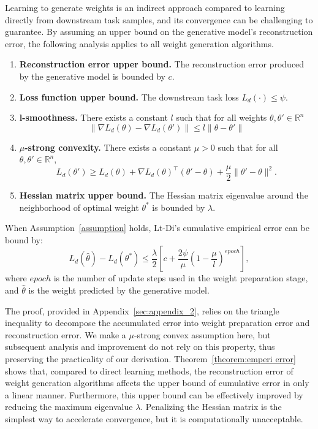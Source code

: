 Learning to generate weights is an indirect approach compared to learning directly from downstream task samples, and its convergence can be challenging to guarantee. By assuming an upper bound on the generative model's reconstruction error, the following analysis applies to all weight generation algorithms.
\begin{assumption}\label{assumption}
\noindent
\begin{enumerate}
    \item \textbf{Reconstruction error upper bound.}
    The reconstruction error produced by the generative model is bounded by $c$.
    \item \textbf{Loss function upper bound.}
    The downstream task loss $L_d(\cdot) \leq \psi$.
    \item \textbf{l-smoothness.}
    There exists a constant $l$ such that for all weights \( \theta, \theta' \in \mathbb{R}^n \)
    \[
    \|\nabla L_d(\theta) - \nabla L_d(\theta')\| \leq l \|\theta - \theta'\|
    \]
    \item \textbf{$\mu$-strong convexity.}
    There exists a constant \( \mu > 0 \) such that for all \( \theta,\theta' \in \mathbb{R}^n \),
    \[
    L_d(\theta') \geq L_d(\theta) + \nabla L_d(\theta)^\top (\theta' - \theta) + \frac{\mu}{2} \| \theta' - \theta \|^2.
    \]
    \item \textbf{Hessian matrix upper bound.}
    The Hessian matrix eigenvalue around the neighborhood of optimal weight $\theta^*$ is bounded by $\lambda$.
\end{enumerate}
\end{assumption}

\begin{theorem}\label{theorem:emperi error}
When Assumption~\ref{assumption} holds, Lt-Di's cumulative empirical error can be bound by:
$$
    L_d(\hat{\theta})-L_d(\theta^*) \leq \frac{\lambda}{2} \left[c+\frac{2\psi}{\mu}\left(1 - \frac{\mu}{l}\right)^{epoch}\right],
$$
where $epoch$ is the number of update steps used in the weight preparation stage, and $\hat{\theta}$ is the weight predicted by the generative model.
\end{theorem}

The proof, provided in Appendix~\ref{sec:appendix_2}, relies on the triangle inequality to decompose the accumulated error into weight preparation error and reconstruction error. We make a $\mu$-strong convex assumption here, but subsequent analysis and improvement do not rely on this property, thus preserving the practicality of our derivation. Theorem~\ref{theorem:emperi error} shows that, compared to direct learning methods, the reconstruction error of weight generation algorithms affects the upper bound of cumulative error in only a linear manner. Furthermore, this upper bound can be effectively improved by reducing the maximum eigenvalue $\lambda$. Penalizing the Hessian matrix is the simplest way to accelerate convergence, but it is computationally unacceptable. 

